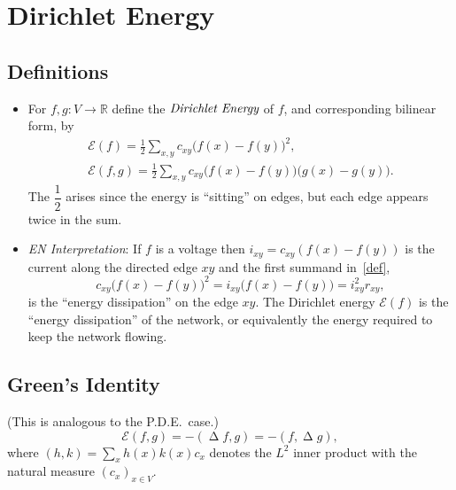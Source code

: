 \documentclass[a4paper]{amsart}
\theoremstyle{plain}
\theoremstyle{definition}
\theoremstyle{remark}
\DeclareMathOperator{\lap}{\Delta}
\begin{document}
\section{\textbf{Dirichlet Energy}}

\subsection{Definitions}
\begin{itemize}
\item For $ f,g:V\to \mathbb{R} $ define the $\emph{Dirichlet Energy} $ of $ f $, and corresponding bilinear form, by
\begin{equation} \label{def}
\begin{gathered}
\boxed{ \mathcal{E} (f)  = \frac{1}{2} \sum_{x,y} c_{xy}\big(f(x) - f(y)\big)^2, }\\
\boxed{ \mathcal{E}(f,g)  = \frac{1}{2}  \sum_{x,y} c_{xy}\big(f(x) - f(y)\big) \big(g(x) - g(y)\big). }
\end{gathered}
\end{equation} 
The $ \dfrac{1}{2} $ arises since the energy is ``sitting'' on edges, but each edge appears twice in the sum.

\item \emph{EN Interpretation}: If $ f $ is a voltage then $ i_{xy} = c_{xy} (f(x) - f(y) )$ is the current along the  directed  edge $ xy $ and the first summand in~\eqref{def},
\begin{equation} \label{ened} 
   c_{xy}\big(f(x) - f(y)\big)^2 = i_{xy} \big(f(x) - f(y) \big) = i_{xy}^2 r_{xy},
\end{equation} 
 is the ``energy dissipation'' on the edge $ xy $.  The Dirichlet energy  $ \mathcal{E}(f) $ is the ``energy dissipation'' of the network, or equivalently the energy required to keep the network flowing.
 \end{itemize} 
 
 
 \subsection{Green's Identity}
(This is analogous to the P.D.E.\  case.) 
\begin{equation} \label{gi}
\boxed{\mathcal{E}(f,g) = - (\lap f, g) = -( f,\lap g),} 
\end{equation}
where $ (h,k) = \sum_x h(x) k(x) c_x $ denotes the $ L^2 $ inner product with the 
 natural measure $ (c_x)_{x\in V} $.
 
\end{document}
